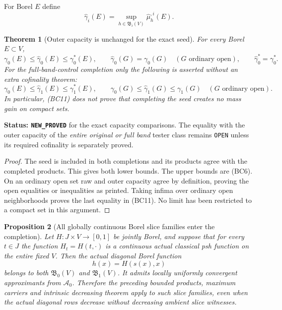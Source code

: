 \documentclass[11pt,a4paper]{article}
\numberwithin{equation}{section}
\newtheorem{theorem}{Theorem}[section]
\newtheorem{proposition}[theorem]{Proposition}
\theoremstyle{definition}
\theoremstyle{remark}
\begin{document}
For Borel $E$ define
\[
                \widehat\gamma_i(E)
                  =\sup_{h\in\mathfrak B_i(V)}\widehat\mu_h^{,i}(E).
 \tag{BC10}
\]
\begin{theorem}[Outer capacity is unchanged for the exact seed]
\label{thm:r12-band-completion-outer-capacity}
For every Borel $E\subset V$,
\[
 \gamma_0(E)\leq\widehat\gamma_0(E)\leq\gamma_0^*(E),
 \qquad
 \widehat\gamma_0(G)=\gamma_0(G)\quad(G\text{ ordinary open}),
 \qquad
 \widehat\gamma_0^*=\gamma_0^*.
 \tag{BC11}
\]
For the full-band-control completion only the following is
asserted without an extra cofinality theorem:
\[
 \gamma_0(E)\leq\widehat\gamma_1(E)\leq\gamma_1^*(E),
 \qquad
 \gamma_0(G)\leq\widehat\gamma_1(G)\leq\gamma_1(G)
                       \quad(G\text{ ordinary open}).
 \tag{BC12}
\]
In particular, (BC11) does not prove that completing the seed
creates no mass gain on compact sets.
\end{theorem}

\noindent\textbf{Status: \texttt{NEW\_PROVED}} for the exact
capacity comparisons. The equality with the outer capacity of
the \emph{entire original or full band} tester class remains
\texttt{OPEN} unless its required cofinality is separately proved.

\begin{proof}
The seed is included in both completions and its products agree
with the completed products. This gives both lower bounds.
The upper bounds are (BC6). On an ordinary open set raw and
outer capacity agree by definition, proving the open equalities
or inequalities as printed. Taking infima over ordinary open
neighborhoods proves the last equality in (BC11). No limit has
been restricted to a compact set in this argument.
\end{proof}

\begin{proposition}[All globally continuous Borel slice families enter the completion]
\label{prop:r12-continuous-slice-completion}
Let $H:J\times V\to[0,1]$ be jointly Borel, and suppose that
for every $t\in J$ the function $H_t=H(t,\cdot)$ is a
continuous actual classical psh function on the entire fixed
$V$. Then the actual diagonal Borel function
\[
                                h(x)=H(s(x),x)
 \tag{BC13}
\]
belongs to both $\mathfrak B_0(V)$ and $\mathfrak B_1(V)$.
It admits locally uniformly convergent approximants from
$\mathcal A_0$. Therefore the preceding bounded products,
maximum carriers and intrinsic decreasing theorem apply to
such slice families, even when the actual diagonal rows
decrease without decreasing ambient slice witnesses.
\end{proposition}
\end{document}
